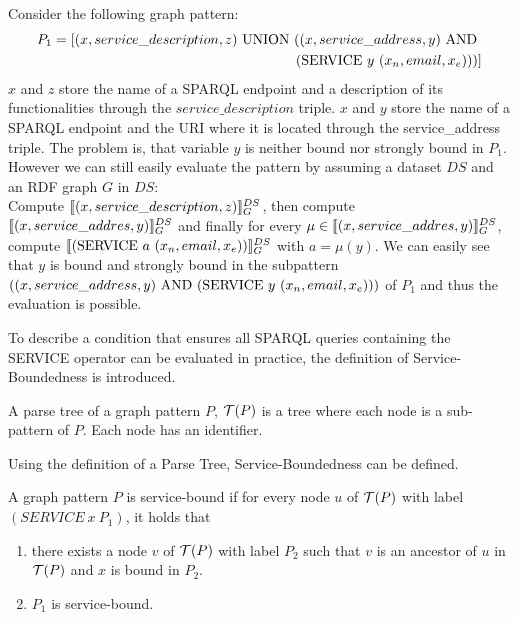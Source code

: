 \begin{example}
Consider the following graph pattern:
\begin{align*}
P_1 = [(x,service\_description,z) \mbox{ UNION } ((x,service\_address, y) \mbox{ AND }
\\\
(\mbox{SERVICE } y \ (x_n,email,x_e)))]
\end{align*}
$x$ and $z$ store the name of a SPARQL endpoint and a description of its
functionalities through the $service\_description$ triple. $x$ and $y$ store the
name of a SPARQL endpoint and the URI where it is located through the
service\_address triple. The problem is, that variable $y$ is neither bound nor
strongly bound in $P_1$. However we can still easily evaluate the pattern by
assuming a dataset $DS$ and an RDF graph $G$ in $DS$:\\
Compute $\llbracket (x, service\_description,z)\rrbracket^{DS}_G$, then compute \\
$\llbracket (x, service\_addres,y) \rrbracket^{DS}_G$ and finally for every
$\mu \in \llbracket (x, service\_addres,y) \rrbracket^{DS}_G$, compute $\llbracket (\mbox{SERVICE }
a \ (x_n,email,x_e))\rrbracket^{DS}_G$ with $a = \mu(y)$. We can easily see that $y$ is
bound and strongly bound in the subpattern \\ $((x,service\_address, y) \mbox{ AND }
(\mbox{SERVICE } y \ (x_n,email,x_e)))$ of $P_1$ and thus the evaluation is possible.
\end{example}

\noindent To describe a condition that ensures all SPARQL queries containing the SERVICE
operator can be evaluated in practice, the definition of Service-Boundedness is
introduced.  

\begin{definition}
	A parse tree of a graph pattern $P$, $\mathcal{T}(P)$ is a tree where each
	node is a sub-pattern of $P$. Each node has an identifier.
\end{definition}

Using the definition of a Parse Tree, Service-Boundedness can be defined.

\begin{definition}
	A graph pattern $P$ is service-bound if for every node $u$ of $\mathcal{T}(P)$ with
	label $(SERVICE \ x\  P_1)$, it holds that
	\begin{enumerate}
		\item there exists a node $v$ of $\mathcal{T}(P)$ with label $P_2$ such that $v$
			is an ancestor of $u$ in $\mathcal{T}(P)$ and $x$ is bound in $P_2$.
		\item $P_1$ is service-bound.
	\end{enumerate}
\end{definition}

